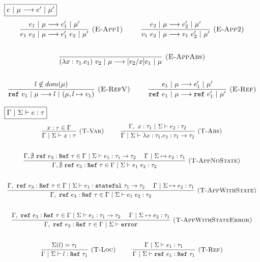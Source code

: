 \documentclass{llncs}
\newcommand{\reftt}{\mathtt{ref}~}
\newcommand{\Reftt}{\mathtt{Ref}~}
\newcommand{\stateful}{\mathtt{stateful}~}
\begin{document}
$\fbox{$e~|~\mu \longrightarrow e'~|~\mu'$}$
\[
\begin{array}{c}
\infer[\textsc{(E-App1)}]
  {e_1~e_2~|~\mu \longrightarrow e_1'~e_2~|~\mu'}
  {e_1~|~\mu \longrightarrow e_1'~|~\mu'} 
~~~~~~~~
\infer[\textsc{(E-App2)}]
  {v_1~e_2~|~\mu \longrightarrow v_1~e_2'~|~\mu'}
  {e_2~|~\mu \longrightarrow e_2'~|~\mu'}\\[5ex]

\infer[\textsc{(E-AppAbs)}]
  {(\lambda x : \tau_1.e_1)~v_2~|~\mu \longrightarrow [v_2/x]e_1~|~\mu}
  { }\\[5ex]

\infer[\textsc{(E-RefV)}]
  {\reftt v_1~|~\mu \longrightarrow l ~|~(\mu, l \mapsto v_1)}
  {l \notin dom(\mu)}
~~~~~~~~
\infer[\textsc{(E-Ref)}]
  {\reftt e_1~|~\mu \longrightarrow \reftt e_1'~|~\mu'}
  {e_1~|~\mu \longrightarrow e_1'~|~\mu'}
\end{array}
\]

$\fbox{$\Gamma~|~\Sigma \vdash e : \tau$}$
\[
\begin{array}{c}
\infer[\textsc{(T-Var)}]
  {\Gamma~|~\Sigma \vdash x : \tau}
  {x : \tau \in \Gamma}
~~~~~~~~
\infer[\textsc{(T-Abs)}]
  {\Gamma~|~\Sigma \vdash \lambda x : \tau_1.e_2 : \tau_1 \rightarrow \tau_2}
  {\Gamma,~x : \tau_1~|~\Sigma \vdash e_2 : \tau_2}\\[5ex]

\infer[\textsc{(T-AppNoState)}]
  {\Gamma, \nexists~\reftt e_3 : \Reftt \tau \in \Gamma~|~\Sigma \vdash e_1~e_2 : \tau_2}
  {\Gamma, \nexists~\reftt e_3 : \Reftt \tau \in \Gamma~|~\Sigma \vdash e_1 : \tau_1 \rightarrow \tau_2
  ~~~~ \Gamma~|~\Sigma \mapsto e_2 : \tau_1}\\[5ex]
  
\infer[\textsc{(T-AppWithState)}]
  {\Gamma,~\reftt e_3 : \Reftt \tau \in \Gamma~|~\Sigma \vdash e_1~e_2 : \tau_2}
  {\Gamma,~\reftt e_3 : \Reftt \tau \in \Gamma~|~\Sigma \vdash e_1 : \stateful \tau_1 \rightarrow \tau_2
  ~~~~ \Gamma~|~\Sigma \mapsto e_2 : \tau_1}\\[5ex]
  
\infer[\textsc{(T-AppWithStateError)}]
  {\Gamma,~\reftt e_3 : \Reftt \tau \in \Gamma~|~\Sigma \vdash \mathtt{error}}
  {\Gamma,~\reftt e_3 : \Reftt \tau \in \Gamma~|~\Sigma \vdash e_1 : \tau_1 \rightarrow \tau_2
  ~~~~ \Gamma~|~\Sigma \mapsto e_2 : \tau_1}\\[5ex]
  
\infer[\textsc{(T-Loc)}]
  {\Gamma~|~\Sigma \vdash l : \Reftt \tau_1}
  {\Sigma(l) = \tau_1}
~~~~~~~~
\infer[\textsc{(T-Ref)}]
  {\Gamma~|~\Sigma \vdash \reftt e_1 : \Reftt \tau_1}
  {\Gamma~|~\Sigma \vdash e_1 : \tau_1}
\end{array}
\]
\end{document}
